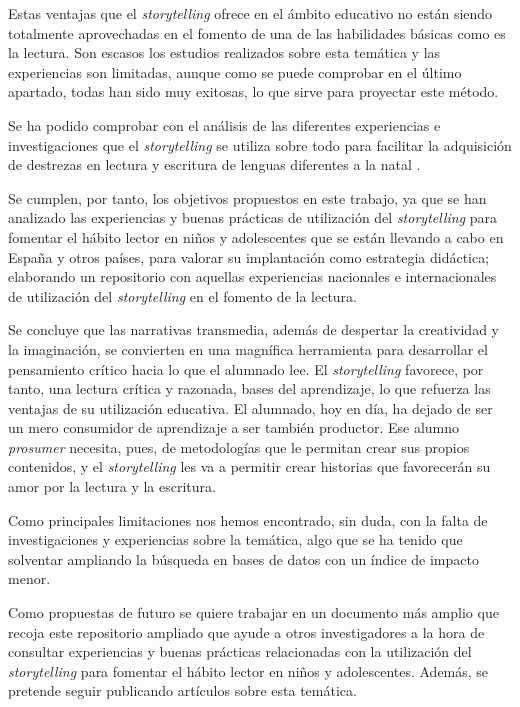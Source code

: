 \documentclass[spanish]{textolivre}
\begin{document}
Estas ventajas que el \textit{storytelling} ofrece en el ámbito educativo no están siendo totalmente aprovechadas en el fomento de una de las habilidades básicas como es la lectura. Son escasos los estudios realizados sobre esta temática y las experiencias son limitadas, aunque como se puede comprobar en el último apartado, todas han sido muy exitosas, lo que sirve para proyectar este método. 

Se ha podido comprobar con el análisis de las diferentes experiencias e investigaciones que el \textit{storytelling} se utiliza sobre todo para facilitar la adquisición de destrezas en lectura y escritura de lenguas diferentes a la natal \cite{arenas_efecto_2018,cedeno_damil_lectura_2019,gomez_palacio_strategies_2010}. 

Se cumplen, por tanto, los objetivos propuestos en este trabajo, ya que se han analizado las experiencias y buenas prácticas de utilización del \textit{storytelling} para fomentar el hábito lector en niños y adolescentes que se están llevando a cabo en España y otros países, para valorar su implantación como estrategia didáctica; elaborando un repositorio con aquellas experiencias nacionales e internacionales de utilización del \textit{storytelling} en el fomento de la lectura.

Se concluye que las narrativas transmedia, además de despertar la creatividad y la imaginación, se convierten en una magnífica herramienta para desarrollar el pensamiento crítico hacia lo que el alumnado lee. El \textit{storytelling} favorece, por tanto, una lectura crítica y razonada, bases del aprendizaje, lo que refuerza las ventajas de su utilización educativa.
El alumnado, hoy en día, ha dejado de ser un mero consumidor de aprendizaje a ser también productor. Ese alumno \textit{prosumer} necesita, pues, de metodologías que le permitan crear sus propios contenidos, y el \textit{storytelling} les va a permitir crear historias que favorecerán su amor por la lectura y la escritura.

Como principales limitaciones nos hemos encontrado, sin duda, con la falta de investigaciones y experiencias sobre la temática, algo que se ha tenido que solventar ampliando la búsqueda en bases de datos con un índice de impacto menor.

Como propuestas de futuro se quiere trabajar en un documento más amplio que recoja este repositorio ampliado que ayude a otros investigadores a la hora de consultar experiencias y buenas prácticas relacionadas con la utilización del \textit{storytelling} para fomentar el hábito lector en niños y adolescentes. Además, se pretende seguir publicando artículos sobre esta temática.
\end{document}
